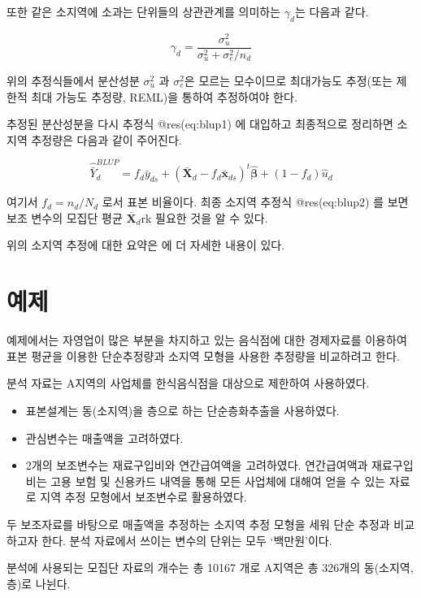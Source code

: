 \documentclass[
]{book}
\newcommand{\bm}[1]{ \symbf{#1}}
\begin{document}
또한 같은 소지역에 소과는 단위들의 상관관계를 의미하는 \(\gamma_d\)는 다음과 같다.

\[ \gamma_d = \frac{ \sigma_u^2}{\sigma_u^2 + \sigma_e^2 / n_d}\]

위의 추정식들에서 분산성분 \(\sigma^2_u\) 과 \(\sigma^2_e\)은 모르는 모수이므로
최대가능도 추정(또는 제한적 최대 가능도 추정량, REML)을 통하여 추정하여야 한다.

추정된 분산성분을 다시 추정식 @res(eq:blup1) 에 대입하고 최종적으로 정리하면 소지역 추정량은 다음과 같이 주어진다.

\begin{equation}
\hat {\bar Y}_d^{BLUP} = f_d \bar y_{ds} + (\bar {\bm X}_d - f_d \bar {\bm x}_{ds})^t
\hat {\bm \beta} + (1-f_d) \hat u_d 
\label{eq:blup2}
\end{equation}

여기서 \(f_d = n_d/N_d\) 로서 표본 비율이다. 최종 소지역 추정식 @res(eq:blup2) 를 보면
보조 변수의 모집단 평균 \(\bar {\bm X}_d\)rk 필요한 것을 알 수 있다.

위의 소지역 추정에 대한 요약은 \citep{molina2015sae}에 더 자세한 내용이 있다.

\hypertarget{uxc608uxc81c}{%
\section{예제}\label{uxc608uxc81c}}

예제에서는 자영업이 많은 부분을 차지하고 있는 음식점에 대한 경제자료를 이용하여 표본 평균을 이용한 단순추정량과 소지역 모형을 사용한 추정량을 비교하려고 한다.

분석 자료는 A지역의 사업체를 한식음식점을 대상으로 제한하여 사용하였다.

\begin{itemize}
\item
  표본설계는 동(소지역)을 층으로 하는 단순층화추출을 사용하였다.
\item
  관심변수는 매출액을 고려하였다.
\item
  2개의 보조변수는 재료구입비와 연간급여액을 고려하였다. 연간급여액과 재료구입비는 고용 보험 및 신용카드 내역을 통해 모든 사업체에 대해여 얻을 수 있는 자료로 지역 추정 모형에서 보조변수로 활용하였다.
\end{itemize}

두 보조자료를 바탕으로 매출액을 추정하는 소지역 추정 모형을 세워 단순 추정과 비교하고자 한다. 분석 자료에서 쓰이는 변수의 단위는 모두 `백만원'이다.

분석에 사용되는 모집단 자료의 개수는 총 10167 개로 A지역은 총 326개의 동(소지역, 층)로 나뉜다.
\end{document}
